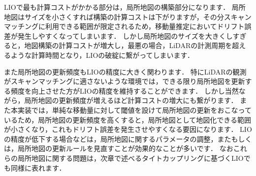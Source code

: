 LIOで最も計算コストがかかる部分は，局所地図の構築部分になります．
局所地図はサイズを小さくすれば構築の計算コストは下がりますが，その分スキャンマッチングに利用できる範囲が限定されるため，移動量推定においてドリフト誤差が発生しやすくなってしまいます．
しかし局所地図のサイズを大きくしすぎると，地図構築の計算コストが増大し，最悪の場合，LiDARの計測周期を超えるような計算時間となり，LIOの破綻に繋がってしまいます．

また局所地図の更新頻度もLIOの精度に大きく関わります．
特にLiDARの観測がスキャンマッチングに適さないような環境では，できる限り局所地図を更新する頻度を向上させた方がLIOの精度を維持することができます．
しかし当然ながら，局所地図の更新頻度が増えるほど計算コストの増大にも繋がります．
また本実装では，単純な移動量に対して閾値を設けて局所地図の更新をおこなっているため，局所地図の更新頻度を高くすると，局所地図として地図化できる範囲が小さくなり，これもドリフト誤差を発生させやすくなる要因になります．
LIOの精度が低下する場合などは，局所地図に関するパラメータの調整，またもしくは，局所地図の更新ルールを見直すことが効果的なことが多いです．
なおこれらの局所地図に関する問題は，次章で述べるタイトカップリングに基づくLIOでも同様に表れます．



















